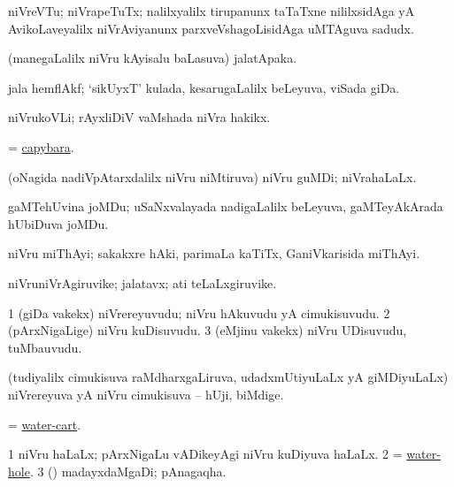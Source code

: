 \bentry
{} 
\gl{\nA}
\expl{}
\bmng
niVreVTu; niVrapeTuTx; nalilxyalilx tirupanunx taTaTxne nililxsidAga yA AvikoLaveyalilx niVrAviyanunx parxveVshagoLisidAga uMTAguva sadudx. 
\emng
\eentry

\bentry
{} 
\gl{\nA}
\expl{}
\bmng
(manegaLalilx niVru kAyisalu baLasuva) jalatApaka. 
\emng
\eentry

\bentry
{} 
\gl{\nA}
\expl{}
\bmng
jala hemflAkf; `sikUyxT' kulada, kesarugaLalilx beLeyuva, viSada giDa. 
\emng
\eentry

\bentry
{} 
\gl{\nA}
\expl{}
\bmng
niVrukoVLi; rAyxliDiV vaMshada niVra hakikx. 
\emng
\eentry

\bentry
{} 
\gl{\nA}
\bmng
= \hyperref{kandict_c.pdf}{C}{capybara}{capybara}. 
\emng
\eentry

\bentry
{} 
\gl{\nA}
\bmng
(oNagida nadiVpAtarxdalilx niVru niMtiruva) niVru guMDi; niVrahaLaLx. 
\emng
\eentry

\bentry
{} 
\gl{\nA}
\expl{}
\bmng
gaMTehUvina joMDu; uSaNxvalayada nadigaLalilx beLeyuva, gaMTeyAkArada hUbiDuva joMDu. 
\emng
\eentry

\bentry
{} 
\gl{\nA}
\expl{}
\bmng
niVru miThAyi; sakakxre hAki, parimaLa kaTiTx, GaniVkarisida miThAyi. 
\emng
\eentry

\bentry
{} 
\gl{\nA}
\expl{}
\bmng
niVruniVrAgiruvike; jalatavx; ati teLaLxgiruvike. 
\emng
\eentry

\bentry
{} 
\gl{\nA}
\expl{}
\bmng
\bnum
\num{1} (giDa \mo vakekx) niVrereyuvudu; niVru hAkuvudu yA cimukisuvudu. 
\num{2} (pArxNigaLige) niVru kuDisuvudu. 
\num{3} (eMjinu \mo vakekx) niVru UDisuvudu, tuMbauvudu. 
\enum
\emng
\eentry

\bentry
{} 
\gl{\nA}
\expl{}
\bmng
(tudiyalilx cimukisuva raMdharxgaLiruva, udadxmUtiyuLaLx yA giMDiyuLaLx) niVrereyuva yA niVru cimukisuva -- hUji, biMdige. 
\emng
\eentry

\bentry
{} 
\gl{\nA}
\expl{}
\bmng
= \hyperlink{water-cart}{water-cart}. 
\emng
\eentry

\bentry
{} 
\gl{\nA}
\expl{}
\bmng
\bnum
\num{1} niVru haLaLx; pArxNigaLu vADikeyAgi niVru kuDiyuva haLaLx. 
\num{2} = \hyperlink{water-hole}{water-hole}. 
\num{3} (\ashi) madayxdaMgaDi; pAnagaqha. 
\enum
\emng
\eentry

